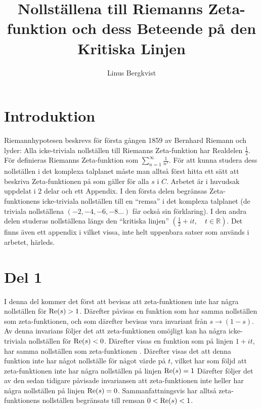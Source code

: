 \documentclass[a4paper]{article}%
\begin{document}
\title{Nollställena till Riemanns Zeta-funktion och dess Beteende på den Kritiska Linjen}
\author{Linus Bergkvist}
\date{}
\maketitle

\pagebreak
\section*{Introduktion}
Riemannhypotesen beskrevs för första gången 1859 av Bernhard Riemann och lyder:
Alla icke-triviala nollställen till Riemanns Zeta-funktion har Realdelen $\frac 1 2$.
För  definieras Riemanns Zeta-funktion som $\sum\limits_{n = 1}^\infty \frac 1 {n^s}$. 
För att kunna studera dess nollställen i det komplexa talplanet måste man alltså först hitta
ett sätt att beskriva Zeta-funktionen på som gäller för alla $s$ i $C$. 
Arbetet är i huvudsak uppdelat i 2 delar och ett Appendix. I den första delen begränsas 
Zeta-funktionens icke-triviala nollställen till en ``remsa'' i det komplexa talplanet 
(de triviala nollställena $(-2, -4, -6, -8\ldots)$ får också sin förklaring). 
I den andra delen studeras nollställena längs den ``kritiska linjen'' $(\frac 1 2 + it,\quad t \in \mathbb{R})$.
Det finns även ett appendix i vilket vissa, inte helt uppenbara satser som används i arbetet, härleds.

\newcommand{\mres}{
	\mRe{s}
}

\newcommand{\zfn}{
	zeta-funktionen
}

\section*{Del 1}
I denna del kommer det först att bevisas att zeta-funktionen inte har några nollställen för $\mres > 1$.
Därefter påvisas en funktion som har samma nollställen som zeta-funktionen, och som därefter bevisas
vara invariant från $s \to (1 - s)$. Av denna invarians följer det att zeta-funktionen omöjligt kan 
ha några icke-triviala nollställen för $\mres < 0$. Därefter visas en funktion som på linjen $1 + it$, har
samma nollställen som \zfn. Därefter visas det att denna funktion inte har något nollställe för något värde
på $t$, vilket har som följd att \zfn inte har några nollställen på linjen $\mres = 1$ Därefter följer det 
av den sedan tidigare påvisade invariansen att \zfn inte heller har några nollställen på linjen $\mres = 0$.
Sammanfattningsvis har alltså zeta-funktionens nollställen begränsats till remsan $0 < \mres < 1$.\\
\\
\end{document}
